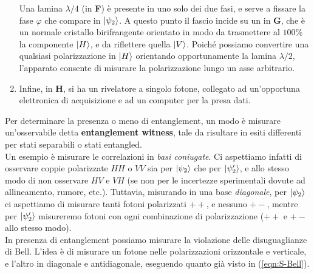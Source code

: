 \documentclass[../../InformazioneQuantistica.tex]{subfiles}
\begin{document}
\begin{enumerate}
\begin{figure}[H]
    \end{figure}
    Una lamina $\lambda/4$ (in \textbf{F}) è presente in uno solo dei due fasi, e serve a fissare la fase $\varphi$ che compare in $\Ket{\psi_2}$. A questo punto il fascio incide su un  in \textbf{G}, che è un normale cristallo birifrangente orientato in modo da trasmettere al $100\%$ la componente $\Ket{H}$, e da riflettere quella $\Ket{V}$. Poiché possiamo convertire una qualsiasi polarizzazione in $\Ket{H}$ orientando opportunamente la lamina $\lambda/2$, l'apparato consente di misurare la polarizzazione lungo un asse arbitrario.
    \item Infine, in \textbf{H}, si ha un rivelatore a singolo fotone, collegato ad un'opportuna elettronica di acquisizione e ad un computer per la presa dati.
\end{enumerate}

Per determinare la presenza o meno di entanglement, un modo è misurare un'osservabile detta \textbf{entanglement witness}, tale da risultare in esiti differenti per stati separabili o stati entangled.\\
Un esempio è misurare le correlazioni in \textit{basi coniugate}. Ci aspettiamo infatti di osservare coppie polarizzate $HH$ o $VV$ sia per $\Ket{\psi_2}$ che per $\Ket{\psi_2'}$, e allo stesso modo di non osservare $HV$ e $VH$ (se non per le incertezze sperimentali dovute ad allineamento, rumore, etc.). Tuttavia, misurando in una base \textit{diagonale}, per $\Ket{\psi_2}$ ci aspettiamo di misurare tanti fotoni polarizzati $++$, e nessuno $+-$, mentre per $\Ket{\psi_2'}$ misureremo fotoni con ogni combinazione di polarizzazione ($++$ e $+-$ allo stesso modo).\\

In presenza di entanglement possiamo misurare la violazione delle disuguaglianze di Bell. L'idea è di misurare un fotone nelle polarizzazioni orizzontale e verticale, e l'altro in diagonale e antidiagonale, eseguendo quanto già visto in (\ref{eqn:S-Bell}). 
\end{document}

